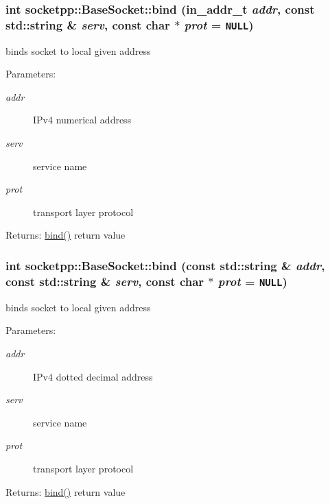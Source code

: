 \begin{CompactItemize}
{\subsubsection[{bind}]{\setlength{\rightskip}{0pt plus 5cm}int socketpp::BaseSocket::bind (in\_\-addr\_\-t {\em addr}, \/  const std::string \& {\em serv}, \/  const char $\ast$ {\em prot} = {\tt NULL})}}
\label{classsocketpp_1_1BaseSocket_aab800bcb5ee48cd4410ae2b9ed83e23}


binds socket to local given address 

\begin{Desc}
\item[Parameters:]
\begin{description}
\item[{\em addr}]IPv4 numerical address \item[{\em serv}]service name \item[{\em prot}]transport layer protocol \end{description}
\end{Desc}
\begin{Desc}
\item[Returns:]\hyperlink{classsocketpp_1_1BaseSocket_78c2a8e6a5c7dfbc708c9cd637e88e51}{bind()} return value \end{Desc}
\hypertarget{classsocketpp_1_1BaseSocket_4775f13f8e1cceaaed40106162b2149f}{
\subsubsection[{bind}]{\setlength{\rightskip}{0pt plus 5cm}int socketpp::BaseSocket::bind (const std::string \& {\em addr}, \/  const std::string \& {\em serv}, \/  const char $\ast$ {\em prot} = {\tt NULL})}}
\label{classsocketpp_1_1BaseSocket_4775f13f8e1cceaaed40106162b2149f}


binds socket to local given address 

\begin{Desc}
\item[Parameters:]
\begin{description}
\item[{\em addr}]IPv4 dotted decimal address \item[{\em serv}]service name \item[{\em prot}]transport layer protocol \end{description}
\end{Desc}
\begin{Desc}
\item[Returns:]\hyperlink{classsocketpp_1_1BaseSocket_78c2a8e6a5c7dfbc708c9cd637e88e51}{bind()} return value \end{Desc}
\hypertarget{classsocketpp_1_1BaseSocket_d3df73f534900d40f9dff26171ec93b5}{
}
\end{CompactItemize}
